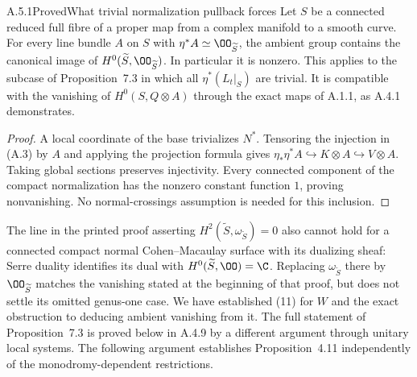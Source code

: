 \begin{statement}{A.5.1}{Proved}{What trivial normalization pullback forces}
Let $S$ be a connected reduced full fibre of a proper map from a complex manifold to a smooth curve. For every line bundle $A$ on $S$ with $\eta^*A\simeq\OO_{\widetilde S}$, the ambient group contains the canonical image of $H^0(\widetilde S,\OO_{\widetilde S})$. In particular it is nonzero. This applies to the subcase of Proposition~7.3 in which all $\eta^*(L_t|_S)$ are trivial. It is compatible with the vanishing of $H^0(S,Q\otimes A)$ through the exact maps of A.1.1, as A.4.1 demonstrates.
\end{statement}
\begin{proof}
A local coordinate of the base trivializes $N^*$. Tensoring the injection in (A.3) by $A$ and applying the projection formula gives
$\eta_*\eta^*A\hookrightarrow K\otimes A\hookrightarrow V\otimes A$.
Taking global sections preserves injectivity. Every connected component of the compact normalization has the nonzero constant function $1$, proving nonvanishing. No normal-crossings assumption is needed for this inclusion.
\end{proof}

The line in the printed proof asserting $H^2(\widetilde S,\omega_{\widetilde S})=0$ also cannot hold for a connected compact normal Cohen--Macaulay surface with its dualizing sheaf: Serre duality identifies its dual with $H^0(\widetilde S,\OO)=\C$. Replacing $\omega_{\widetilde S}$ there by $\OO_{\widetilde S}$ matches the vanishing stated at the beginning of that proof, but does not settle its omitted genus-one case. We have established (11) for $W$ and the exact obstruction to deducing ambient vanishing from it. The full statement of Proposition~7.3 is proved below in A.4.9 by a different argument through unitary local systems. The following argument establishes Proposition~4.11 independently of the monodromy-dependent restrictions.



